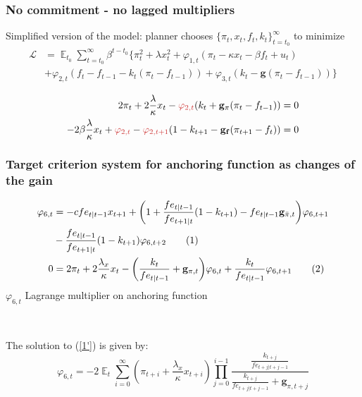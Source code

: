 \documentclass[11pt]{beamer}
\newcommand\numberthis{\addtocounter{equation}{1}\tag{\theequation}} %
\DeclareMathOperator{\E}{\mathbb{E}}
\begin{document}
\begin{frame}[plain]  %
	\frametitle{No commitment - no lagged multipliers}
	\label{no_commitment_intuition}
	
	Simplified version of the model: planner chooses $\{\pi_t, x_t, f_t, k_t\}_{t=t_0}^{\infty}$ to minimize
 \begin{align*}
\mathcal{L} &= \E_{t_0}\sum_{t=t_0}^{\infty} \beta^{t-t_0}\bigg\{ \pi_t^2  + \lambda x_t^2 + \varphi_{1,t} (\pi_t -\kappa x_t- \beta f_t +u_t) \\ &+ \varphi_{2,t}(f_t - f_{t-1} -k_t(\pi_t - f_{t-1})) + \varphi_{3,t}(k_t- \mathbf{g}(\pi_t - f_{t-1})) \bigg\}
 \end{align*}

 \begin{align}
  2\pi_t +2\frac{\lambda}{\kappa}x_t -\textcolor{brownreddark}{\varphi_{2,t}}(k_t + \mathbf{g_{\pi}}(\pi_t -f_{t-1}))& = 0 \label{simpleFOC1} \\
  -2\beta\frac{\lambda}{\kappa}x_t + \textcolor{brownreddark}{\varphi_{2,t}} -\textcolor{brownreddark}{\varphi_{2,t+1}}(1-k_{t+1} -\mathbf{g_{f}}(\pi_{t+1} -f_{t})) & = 0 \label{simpleFOC2} 
 \end{align}

  
\hyperlink{no_commitment}{}	


\end{frame}



\begin{frame}[plain]  %
	\frametitle{Target criterion system for anchoring function as changes of the gain}
	\label{generalTC}

\begin{align*}
\varphi_{6,t} & = -c fe_{t|t-1} x_{t+1} + \bigg(1+ \frac{fe_{t|t-1}}{fe_{t+1|t}}(1-k_{t+1}) -fe_{t|t-1} \mathbf{g}_{\bar{\pi},t} \bigg) \varphi_{6,t+1} \\
& -\frac{fe_{t|t-1}}{fe_{t+1|t}}(1-k_{t+1})\varphi_{6,t+2} \numberthis \label{6'} \\
0 & = 2\pi_t + 2\frac{\lambda_x}{\kappa}x_t   - \bigg( \frac{k_t}{fe_{t|t-1}} + \mathbf{g}_{\pi,t}\bigg)\varphi_{6,t} + \frac{k_t}{fe_{t|t-1}}\varphi_{6,t+1}\numberthis \label{1'}
\end{align*}
$\varphi_{6,t}$ Lagrange multiplier on anchoring function

\

The solution to (\ref{1'}) is given by:
\begin{equation}
\varphi_{6,t} = -2\E_t\sum_{i=0}^{\infty}(\pi_{t+i}+\frac{\lambda_x}{\kappa}x_{t+i})\prod_{j=0}^{i-1}\frac{\frac{k_{t+j}}{fe_{t+j|t+j-1}}}{\frac{k_{t+j}}{fe_{t+j|t+j-1}} + \mathbf{g}_{\pi, t+j}} \label{sol1'}
\end{equation}


\vspace{-0.5cm}
 
\hyperlink{anchTC}{}	


\end{frame}
\end{document}
